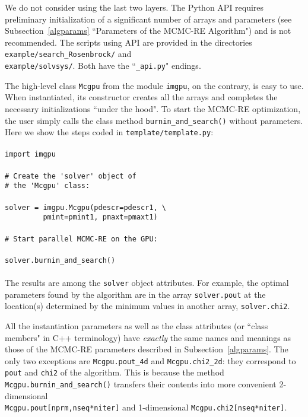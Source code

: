 \documentclass[preprint2]{aastex}
\begin{document}
We do not consider using the last two layers. The Python API requires preliminary 
initialization of a significant number of arrays and parameters 
(see Subsection~\ref{algparams} ``Parameters of the MCMC-RE Algorithm") and is
not recommended. The scripts using API are provided in the directories
\verb"example/search_Rosenbrock/" and \\
\verb"example/solvsys/". Both have the ``\verb|_api.py|" endings.

The high-level class \verb|Mcgpu| from the module \verb|imgpu|,
on the contrary, is easy to use. When instantiated, its constructor creates all
the arrays and completes the necessary initializations ``under the hood". To
start the MCMC-RE optimization, the user simply calls the class method
\verb|burnin_and_search()| without parameters. Here we show the steps coded in
\verb|template/template.py|: \\\\
\verb|import imgpu| \\\\
\verb|# Create the 'solver' object of| \\
\verb|# the 'Mcgpu' class:| \\\\
\verb|solver = imgpu.Mcgpu(pdescr=pdescr1, \| \\
\verb|         pmint=pmint1, pmaxt=pmaxt1)| \\\\
\verb|# Start parallel MCMC-RE on the GPU:| \\\\
\verb|solver.burnin_and_search()| \\\\
The results are among the \verb|solver| object attributes. For example, the
optimal parameters found by the algorithm are in the array \verb|solver.pout|
at the location(s) determined by the minimum values in another array, 
\verb|solver.chi2|.  

All the instantiation parameters as well as the class attributes (or 
``class members" in C++ terminology) have \emph{exactly} the same names 
and meanings as those of the MCMC-RE parameters described in Subsection~\ref{algparams}. 
The only two exceptions are \verb|Mcgpu.pout_4d| and \verb|Mcgpu.chi2_2d|:
they correspond to \verb|pout| and \verb|chi2| of the algorithm. This is
because the method \\
\verb|Mcgpu.burnin_and_search()| transfers their contents
into more convenient 2-dimensional \\
\verb|Mcgpu.pout[nprm,nseq*niter]|
and 1-dimensional \verb|Mcgpu.chi2[nseq*niter]|. 
\end{document}
